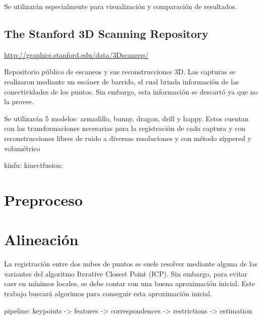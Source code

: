 \documentclass{pfc}
\begin{document}
			Se utilizarán especialmente para visualización
			y comparación de resultados.

		\subsection{The Stanford 3D Scanning Repository}
			\url{http://graphics.stanford.edu/data/3Dscanrep/}

			Repositorio público de escaneos y sus reconstrucciones 3D.
			Las capturas se realizaron mediante un escáner de barrido,
			el cual brinda información de las conectividades de los puntos.
			Sin embargo, esta información se descartó ya que
			\cite{Pancho} no la provee.

			Se utilizarán 5 modelos: armadillo, bunny, dragon, drill y happy.
			Estos cuentan con las transformaciones necesarias para la registración de cada captura y con reconstrucciones libres de ruido a diversas resoluciones y con método zippered %
			y volumétrico



		kinfu:
		kinectfusion:

	\section{Preproceso}

	\section{Alineación}
		La registración entre dos nubes de puntos se suele resolver mediante
		alguna de las variantes del algoritmo Iterative Closest Point (ICP).
		Sin embargo, para evitar caer en mínimos locales,
		se debe contar con una buena aproximación inicial. %
		Este trabajo buscará algorimos para conseguir esta aproximación inicial.

			pipeline: keypoints -> features -> correspondences -> restrictions -> estimation
\end{document}
